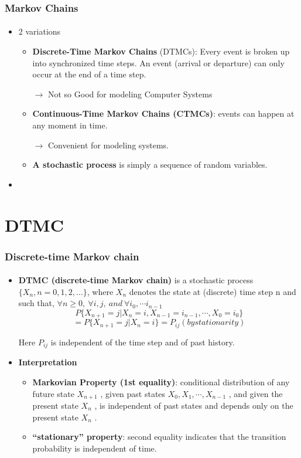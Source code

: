 \documentclass{beamer}
\begin{document}
\begin{frame}
\frametitle{ Markov Chains}
\framesubtitle{\textbf{\textit{}}}
\begin{itemize}
\item 2 variations
\begin{itemize}
\item \textbf{Discrete-Time Markov Chains} (DTMCs): Every event is broken up into synchronized time steps. An event (arrival or departure) can only occur at the end of a time step.

$\rightarrow$ Not so Good for modeling Computer Systems
\item \textbf{Continuous-Time Markov Chains (CTMCs)}: events can happen at any moment in time. 

$\rightarrow$ Convenient for modeling systems.

\item \textbf{A stochastic process} is simply a sequence of random variables.

\end{itemize}

\item 
\end{itemize}
	
\end{frame}

\section{DTMC}
\begin{frame}
\frametitle{ Discrete-time Markov chain}
\framesubtitle{\textbf{\textit{}}}
\begin{itemize}
\item  \textbf{DTMC (discrete-time Markov chain)} is a stochastic process
$\{X_n , n = 0, 1, 2, . . .\}$, where $X_n$ denotes the state at (discrete) time step n and such that, $ \forall n \geq 0, \: \forall i, j , \: and \: \forall i_0 , \cdots  i_{n-1} $
$$ P \{ X_{n+1}  = j | X_n = i, X_{n-1} = i_{n-1},\cdots , X_0 = i_0 \}$$ 
$$= P \{ X_{n +1} = j | X_n = i\} = P_{ij} (by stationarity) $$

Here $P_{ij}$ is independent of the time step and of past history.
\item \textbf{Interpretation}
\begin{itemize}
\item  \textbf{Markovian Property (1st equality)}: conditional distribution of
any future state $X_{n +1}$ , given past states $X_0 , X_1 , \cdots , X_{n-1}$ , and given the present state $X_n$ , is independent of past states and depends only on the present state $X_n$ .

\item \textbf{``stationary'' property}:  second equality indicates that the transition probability is independent of time.

\end{itemize}
\end{itemize}
\end{frame}
\end{document}
